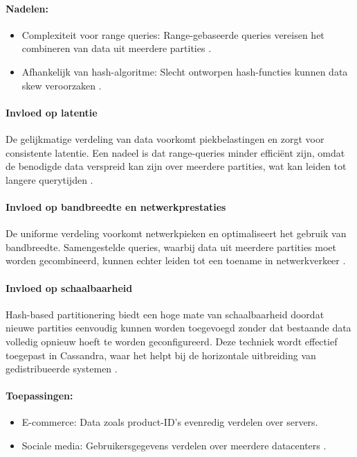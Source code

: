 \paragraph{Nadelen:}
\begin{itemize}
    \item Complexiteit voor range queries: Range-gebaseerde queries vereisen het combineren van data uit meerdere partities \autocite{Mahmud2020}.
    \item Afhankelijk van hash-algoritme: Slecht ontworpen hash-functies kunnen data skew veroorzaken \autocite{Ponnusamy2024}.
\end{itemize}
 
\paragraph{Invloed op latentie} 
De gelijkmatige verdeling van data voorkomt piekbelastingen en zorgt voor consistente latentie. Een nadeel is dat range-queries minder efficiënt zijn, omdat de benodigde data verspreid kan zijn over meerdere partities, wat kan leiden tot langere querytijden \autocite{Mahmud2020}.
 
\paragraph{Invloed op bandbreedte en netwerkprestaties} 
De uniforme verdeling voorkomt netwerkpieken en optimaliseert het gebruik van bandbreedte. Samengestelde queries, waarbij data uit meerdere partities moet worden gecombineerd, kunnen echter leiden tot een toename in netwerkverkeer \autocite{Mahmud2020}.
 
\paragraph{Invloed op schaalbaarheid} 
Hash-based partitionering biedt een hoge mate van schaalbaarheid doordat nieuwe partities eenvoudig kunnen worden toegevoegd zonder dat bestaande data volledig opnieuw hoeft te worden geconfigureerd. Deze techniek wordt effectief toegepast in Cassandra, waar het helpt bij de horizontale uitbreiding van gedistribueerde systemen \autocite{Mahmud2020}.
 
\paragraph{Toepassingen:}
\begin{itemize}
    \item E-commerce: Data zoals product-ID’s evenredig verdelen over servers.
    \item Sociale media: Gebruikersgegevens verdelen over meerdere datacenters \autocite{Mahmud2020}.
\end{itemize}
 

